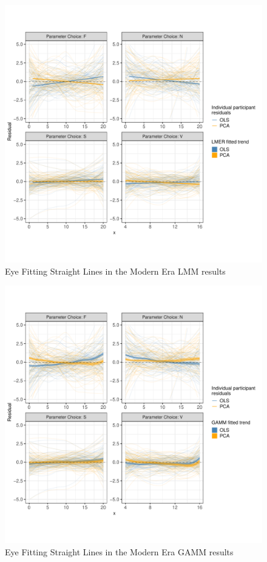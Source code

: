 \documentclass[print]{nuthesis}
\begin{document}
\begin{figure}[tbp]

{\centering \includegraphics[width=0.8\linewidth,]{thesis_files/figure-latex/eyefitting-lmer-residualplots-1} 

}

\caption{Eye Fitting Straight Lines in the Modern Era LMM results}\label{fig:eyefitting-lmer-residualplots}
\end{figure}

\begin{figure}[tbp]

{\centering \includegraphics[width=0.8\linewidth,]{thesis_files/figure-latex/eyefitting-gamm-residualplots-1} 

}

\caption{Eye Fitting Straight Lines in the Modern Era GAMM results}\label{fig:eyefitting-gamm-residualplots}
\end{figure}
\end{document}
